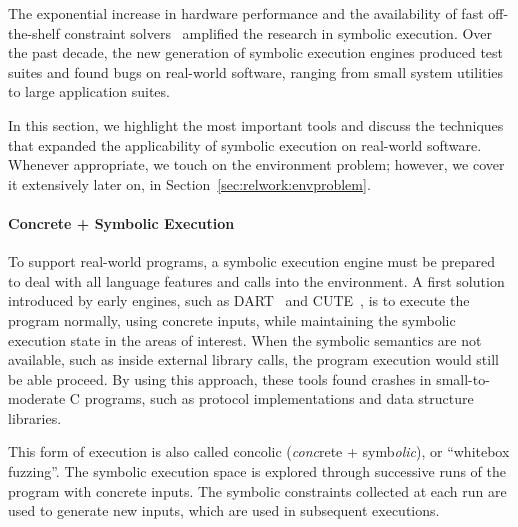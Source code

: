 
The exponential increase in hardware performance and the availability of fast off-the-shelf constraint solvers~\cite{chaff,minisat,stp,Z3,cvc} amplified the research in symbolic execution.  Over the past decade, the new generation of symbolic execution engines produced test suites and found bugs on real-world software, ranging from small system utilities to large application suites.

In this section, we highlight the most important tools and discuss the techniques that expanded the applicability of symbolic execution on real-world software.  Whenever appropriate, we touch on the environment problem; however, we cover it extensively later on, in Section~\ref{sec:relwork:envproblem}.

\paragraph{Concrete + Symbolic Execution}

To support real-world programs, a symbolic execution engine must be prepared to deal with all language features and calls into the environment.
%
A first solution introduced by early engines, such as DART~\cite{dart} and CUTE~\cite{cute}, is to execute the program normally, using concrete inputs, while maintaining the symbolic execution state in the areas of interest.
%
When the symbolic semantics are not available, such as inside external library calls, the program execution would still be able proceed.
%
By using this approach, these tools found crashes in small-to-moderate C programs, such as protocol implementations and data structure libraries.

This form of execution is also called concolic (\emph{conc}rete + symb\emph{olic}), or ``whitebox fuzzing''.  The symbolic execution space is explored through successive runs of the program with concrete inputs.  The symbolic constraints collected at each run are used to generate new inputs, which are used in subsequent executions.



